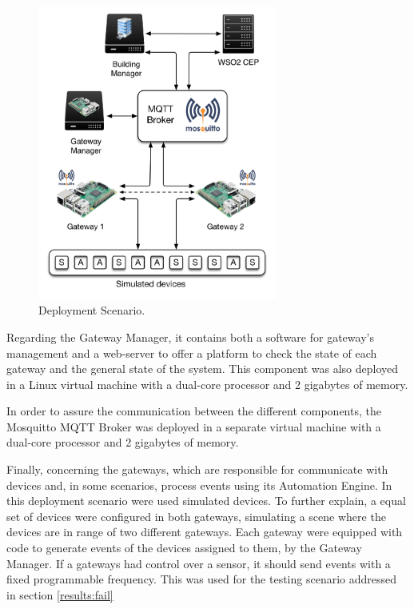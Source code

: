 \begin{figure}[H]
	\centering
	\includegraphics[width=0.7\textwidth]{figures/deployment.png}
	\caption{Deployment Scenario.}
	\label{fig:deploy}
\end{figure}

Regarding the Gateway Manager, it contains both a software for gateway's management and a web-server to offer a platform to check the state of each gateway and the general state of the system. This component was also deployed in a Linux virtual machine with a dual-core processor and 2 gigabytes of memory.

In order to assure the communication between the different components, the Mosquitto MQTT Broker was deployed in a separate virtual machine with a dual-core processor and 2 gigabytes of memory.

Finally, concerning the gateways, which are responsible for communicate with devices and, in some scenarios, process events using its Automation Engine. In this deployment scenario were used simulated devices. To further explain, a equal set of devices were configured in both gateways, simulating a scene where the devices are in range of two different gateways. Each gateway were equipped with code to generate events of the devices assigned to them, by the Gateway Manager. If a gateways had control over a sensor, it should send events with a fixed programmable frequency. This was used for the testing scenario addressed in section \ref{results:fail}%





